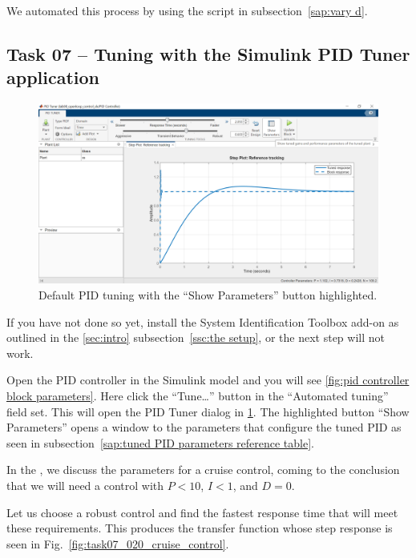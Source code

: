 \documentclass[12pt]{article}
\begin{document}
We automated this process by using the script in  subsection~\ref{sap:vary d}.

\subsection{Task 07 -- Tuning with the Simulink PID Tuner application}\label{ssc:Simulink PID Tuner application}

\begin{figure}
    \centering
    \includegraphics[width=\linewidth]{img/task07_010_default_tuning.png}
    \caption{Default PID tuning with the ``Show Parameters'' button highlighted.}
    \label{fig:task07_010_default_tuning}
\end{figure}

If you have not done so yet,
install the System Identification Toolbox add-on as outlined in the \ref{sec:intro} subsection~\ref{ssc:the setup},
or the next step will not work.

Open the PID controller in the Simulink model
and you will see \ref{fig:pid controller block parameters}.
Here click the ``Tune\dots'' button in the ``Automated tuning'' field set. This will open the PID Tuner dialog in \ref{fig:task07_010_default_tuning}.
The highlighted button ``Show Parameters'' opens a window to the parameters that configure the tuned PID
as seen in  subsection~\ref{sap:tuned PID parameters reference table}.

In the , we discuss the parameters for a cruise control, coming to the conclusion that we will need a control with $P < 10$, $I < 1$, and $D = 0$.

Let us choose a robust control and find the fastest response time that will meet these requirements.
This produces the transfer function whose step response is seen in Fig.~\ref{fig:task07_020_cruise_control}.
\end{document}
